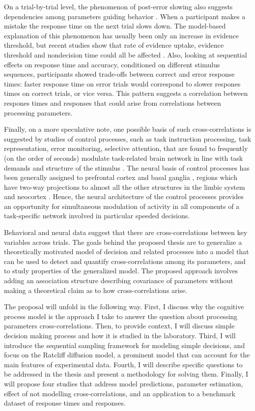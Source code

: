 \documentclass[12pt]{article}
\begin{document}
On a trial-by-trial level, the phenomenon of post-error slowing also suggests dependencies among parameters guiding behavior \citep{VanMal2004}. When a participant makes a mistake the response time on the next trial slows down. The model-based explanation of this phenomenon has usually been only an increase in evidence threshold, but recent studies show that rate of evidence uptake, evidence threshold and nondecision time could all be affected \citep{DutVan2012,DutFor2013}. Also, looking at sequential effects on response time and accuracy, conditioned on different stimulus sequences, participants showed trade-offs between correct and error response times: faster response time on error trials would correspond to slower respones times on correct trials, or vice versa. This pattern suggests a correlation between respones times and responses that could arise from correlations between processing parameters. 

Finally, on a more speculative note, one possible basis of such cross-correlations is suggested by studies of control processes, such as task instruction processing, task representation, error monitoring, selective attention, that are found to frequently (on the order of seconds) modulate task-related brain network in line with task demands and structure of the stimulus \citep{MozKin2007,JonKin2009,ColFra2013}. The neural basis of control processes has been generally assigned to prefrontal cortex and basal ganglia \citep{SchAar2010}, regions which have two-way projections to almost all the other structures in the limbic system and neocortex \citep{MilCoh2001,CalPic2014}. Hence, the neural architecture of the control processes provides an opportunity for simultaneous modulation of activity in all components of a task-specific network involved in particular speeded decisions. 

Behavioral and neural data suggest that there are cross-correlations between key variables across trials. The goals behind the proposed thesis are to generalize a theoretically motivated model of decision and related processes into a model that can be used to detect and quantify cross-correlations among its parameters, and to study properties of the generalized model. The proposed approach involves adding an association structure describing covariance of parameters without making a theoretical claim as to how cross-correlations arise.  
    
The proposal will unfold in the following way. First, I discuss why the cognitive process model is the approach I take to answer the question about processing parameters cross-correlations. Then, to provide context, I will discuss simple decision making process and how it is studied in the laboratory. Third, I will introduce the sequential sampling framework for modeling simple decisions, and focus on the Ratcliff diffusion model, a prominent model that can account for the main features of experimental data. Fourth, I will describe specific questions to be addressed in the thesis and present a methodology for solving them. Finally, I will propose four studies that address model predictions, parameter estimation, effect of not modelling cross-correlations, and an application to a benchmark dataset of response times and responses.
\end{document}

